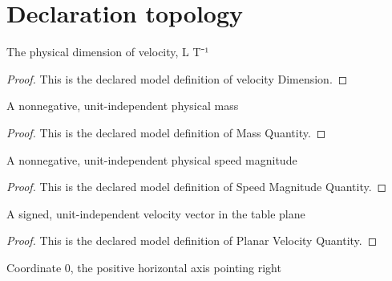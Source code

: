 \section{Declaration topology}
\begin{definition}
  \label{def:physics:phyx-mini-0816:phyxminiproblems-problemphyxmini0816-velocitydimension}
  The physical dimension of velocity, L T⁻¹
\end{definition}
\begin{proof}
  This is the declared model definition of velocity Dimension.
\end{proof}
\begin{definition}
  \label{def:physics:phyx-mini-0816:phyxminiproblems-problemphyxmini0816-massquantity}
  A nonnegative, unit-independent physical mass
\end{definition}
\begin{proof}
  This is the declared model definition of Mass Quantity.
\end{proof}
\begin{definition}
  \label{def:physics:phyx-mini-0816:phyxminiproblems-problemphyxmini0816-speedmagnitudequantity}
  A nonnegative, unit-independent physical speed magnitude
\end{definition}
\begin{proof}
  This is the declared model definition of Speed Magnitude Quantity.
\end{proof}
\begin{definition}
  \label{def:physics:phyx-mini-0816:phyxminiproblems-problemphyxmini0816-planarvelocityquantity}
  A signed, unit-independent velocity vector in the table plane
\end{definition}
\begin{proof}
  This is the declared model definition of Planar Velocity Quantity.
\end{proof}
\begin{definition}[x Axis]
  \label{def:physics:phyx-mini-0816:phyxminiproblems-problemphyxmini0816-xaxis}
  Coordinate 0, the positive horizontal axis pointing right
\end{definition}
